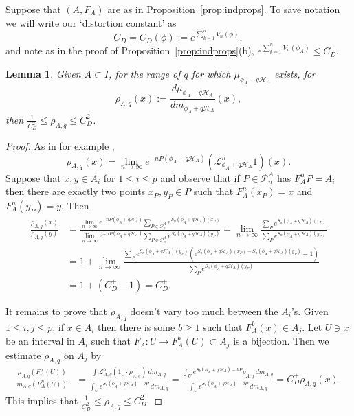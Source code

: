 \documentclass[11pt, reqno]{amsart}
\numberwithin{equation}{section}
\theoremstyle{plain}%
\newtheorem{lma}[thm]{Lemma}
\theoremstyle{definition}
\def\L{\ensuremath{\mathcal L}}
\def\P{\ensuremath{\mathcal P}}
\renewcommand{\H}{\mathcal{H}}
\theoremstyle{nonumberplain}
\begin{document}
Suppose that $(A, F_A)$ are as in Proposition~\ref{prop:indprops}.  To save notation we will write our `distortion constant' as
$$C_D=C_D(\phi) := e^{\sum_{k=1}^nV_n(\phi)},$$
and note as in the proof of Proposition~\ref{prop:indprops}(b), $e^{\sum_{k=1}^nV_n(\phi_A)}\le C_D$.

\begin{lma}
Given $A\subset I$, for the range of $q$ for which $\mu_{\phi_A+q\H_A}$ exists, for 
$$\rho_{A, q}(x):= \frac{d\mu_{\phi_A+q\H_A}}{dm_{\phi_A+q\H_A}}(x),$$
then  $\frac1{C_D^2}\le \rho_{A,q}\le C_D^2$.
\label{lem:densbd} 
\end{lma}

\begin{proof}
As in for example \cite[Section 5]{MauUrb01},
$$\rho_{A, q}(x) = \lim_{n\to\infty} e^{-nP(\phi_A+q\H_A)} (\L_{\phi_A+q\H_A}^n 1)(x).$$
Suppose that $x, y\in A_i$ for $1\le i\le p$ and observe that if $P\in \P_n^A$ has $F_A^nP=A_i$ then there are exactly two points $x_P, y_P\in P$ such that $F_A^n(x_P)=x$ and $F_A^n(y_P)=y$.  Then
\begin{align*}
\frac{\rho_{A, q}(x)}{\rho_{A, q}(y)} & =\frac{\lim_{n\to \infty} e^{-nP(\phi_A+q\H_A)} \sum_{P\in \P_n^A}e^{S_n\left(\phi_A+q\H_A\right)(x_P)}}{\lim_{n\to \infty} e^{-nP(\phi_A+q\H_A)} \sum_{P\in \P_n^A}e^{S_n\left(\phi_A+q\H_A\right)(y_P)}}
= \lim_{n\to \infty} \frac{ \sum_{P}e^{S_n\left(\phi_A+q\H_A\right)(x_P)}}{\sum_{P}e^{S_n\left(\phi_A+q\H_A\right)(y_P)}}\\ 
&= 1 + \lim_{n\to \infty} \frac{ \sum_{P}e^{S_n\left(\phi_A+q\H_A\right)(y_P)}\left(e^{S_n\left(\phi_A+q\H_A\right)(x_P)- S_n\left(\phi_A+q\H_A\right)(y_P)}-1\right)}{\sum_{P}e^{S_n\left(\phi_A+q\H_A\right)(y_P)}}\\
&=1+ \left(C_D^{\pm}-1\right)= C_D^{\pm}.
\end{align*}
  
 It remains to prove that $\rho_{A, q}$ doesn't vary too much between the $A_i$'s.  Given $1\le i, j\le p$, if $x\in A_i$ then there is some $b\ge 1$ such that $F_A^b(x) \in A_j$.  Let  $U\ni x$ be an interval in $A_i$ such that $F_A: U\to F_A^b(U)\subset A_j$ is a bijection.  Then we estimate $\rho_{A, q}$ on $A_j$ by 
\begin{align*}
\frac{\mu_{A, q}(F_A^n(U))}{m_{A, q}(F_A^n(U))} &= \frac{\int \L_{A, q}^b (1_U\cdot \rho_{A, q})~dm_{A, q}}{\int_U e^{S_b \left(\phi_A+q\H_A\right)-bP}~dm_{A, q}}= \frac{\int_U e^{S_b \left(\phi_A+q\H_A\right)-bP}\rho_{A, q}~dm_{A, q}}{\int_U e^{S_b \left(\phi_A+q\H_A\right)-bP}~dm_{A, q}}= C_D^{\pm}\rho_{A, q}(x).
\end{align*}
 This implies that $\frac1{C_D^2}\le \rho_{A, q}\le C_D^2$.
\end{proof}
\end{document}
